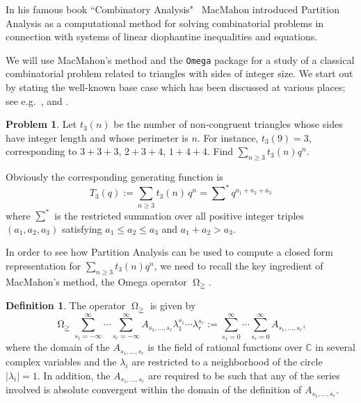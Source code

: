 \documentclass[reqno]{amsart}
\newcommand{\lam}{\lambda}
\DeclareMathOperator*{\Omegaoper}{\Omega}
\newcommand{\Omegaop}{\Omegaoper_{\scriptscriptstyle \geqq}}
\theoremstyle{plain}
\theoremstyle{definition}
\newtheorem{definition}{Definition}
\newtheorem{problem}{Problem}
\theoremstyle{remark}
\begin{document}
In his famous book ``Combinatory Analysis"~%
\cite[Vol.~II, Sect.~VIII, pp.~91--170]{MacMahon:CA}
MacMahon introduced Partition
Analysis as a computational method for solving combinatorial problems in
connection with systems of linear diophantine inequalities and equations.

We will use MacMahon's method and the \texttt{Omega} package
for a study of a classical combinatorial problem related to
triangles with sides of integer size. We start out by stating
the well-known base case which has been discussed
at various places; see e.g.~\cite{Liu,Jordan et al 1,GEA:77,
Jordan et al 2,Honsberger},
and \cite[Ch.~4, Ex.~16]{Stanley:BOOK}.

\begin{problem} \label{prob:triangle}
Let $t_3(n)$ be the number of non-congruent triangles whose sides
have integer length and whose perimeter is $n$. For instance,
$t_3(9)=3$, corresponding to $3+3+3$, $2+3+4$, $1+4+4$. Find
$\sum_{n\ge 3} t_3(n) q^n$.
\end{problem}

Obviously the corresponding generating function is
\begin{equation}
\label{restricted sum}
T_3(q):=\sum_{n\ge 3} t_3(n) \, q^n =
\sum\nolimits^* q^{a_1+a_2+a_3}
\end{equation}
where $\sum^*$ is the restricted summation over
all positive integer triples
$(a_1,a_2,a_3)$ satisfying $a_1 \leq a_2 \leq a_3$
and  $a_1+a_2 > a_3$.

\medskip
In order to see how Partition Analysis can be used
to compute a closed form representation for
$\sum_{n\ge 3} t_3(n) q^n$,
we need to recall
the key ingredient of MacMahon's method, the Omega
operator $\Omegaop$.

\begin{definition} \label{dfn:Omega def}
The operator $\Omegaop$ is given by
\[
\Omegaop \sum_{s_1=-\infty}^{\infty} \cdots \sum_{s_r=-\infty}^{\infty}
A_{s_1,\dots,s_r} \lambda_1^{s_1} \cdots \lambda_r^{s_r} :=
\sum_{s_1=0}^{\infty} \cdots \sum_{s_r=0}^{\infty} A_{s_1,\dots,s_r},
\]
where the domain of the $A_{s_1,\dots,s_r}$ is the field of
rational functions over $\mathbb{C}$ in several complex variables
and the $\lam_i$ are restricted to a neighborhood of the circle
$|\lam_i| = 1$. In addition, the $A_{s_1,\dots,s_r}$ are required
to be such that any of the series involved is absolute convergent
within the domain of the definition of $A_{s_1,\dots,s_r}$.
\end{definition}
\end{document}
